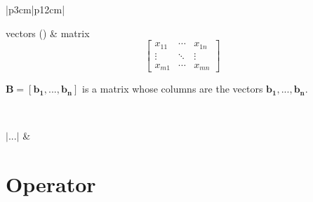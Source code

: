 \begin{longtable}{|p{3cm}|p{12cm}|}
{        \item vectors () \& matrix
        \[
            \begin{bmatrix}
                x_{11} & \cdots & x_{1n}\\
                \vdots & \ddots & \vdots \\
                x_{m1} & \cdots & x_{mn}
            \end{bmatrix}
        \]

        \item $\mathbf{B = [b_1, . . . , b_n]}$ is a matrix whose columns are the vectors $\mathbf{b_1, . . . , b_n}$.
    }\\
    \hline

    $|...|$ & \\
    \hline

\end{longtable}






\section*{Operator}

